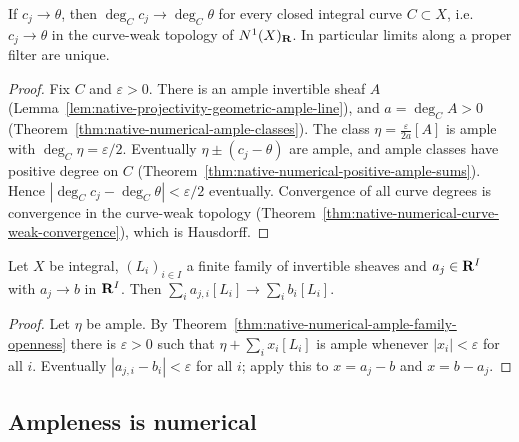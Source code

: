 \begin{lemma}
\label{lem:var-ample-convergence-curve-weak}
\leanok
{}
If $c_j\to\theta$, then $\deg_C c_j\to\deg_C\theta$ for every closed integral curve
$C\subset X$, i.e.\ $c_j\to\theta$ in the curve-weak topology of $N^1(X)_{\mathbf{R}}$. In particular
limits along a proper filter are unique.
\end{lemma}
\begin{proof}
Fix $C$ and $\varepsilon>0$. There is an ample invertible sheaf $A$
(Lemma~\ref{lem:native-projectivity-geometric-ample-line}), and $a=\deg_C A>0$
(Theorem~\ref{thm:native-numerical-ample-classes}). The class $\eta=\frac{\varepsilon}{2a}[A]$
is ample with $\deg_C\eta=\varepsilon/2$. Eventually $\eta\pm(c_j-\theta)$ are ample, and ample
classes have positive degree on $C$ (Theorem~\ref{thm:native-numerical-positive-ample-sums}).
Hence $|\deg_C c_j-\deg_C\theta|<\varepsilon/2$ eventually. Convergence of all curve degrees
is convergence in the curve-weak topology
(Theorem~\ref{thm:native-numerical-curve-weak-convergence}), which is Hausdorff.
\end{proof}

\begin{lemma}
\label{lem:var-ample-convergence-line-family}
\leanok
{}
Let $X$ be integral, $(L_i)_{i\in I}$ a finite family of invertible sheaves and $a_j\in\mathbf{R}^I$
with $a_j\to b$ in $\mathbf{R}^I$. Then $\sum_i a_{j,i}[L_i]\to\sum_i b_i[L_i]$.
\end{lemma}
\begin{proof}
Let $\eta$ be ample. By Theorem~\ref{thm:native-numerical-ample-family-openness} there is
$\varepsilon>0$ such that $\eta+\sum_ix_i[L_i]$ is ample whenever $|x_i|<\varepsilon$ for all
$i$. Eventually $|a_{j,i}-b_i|<\varepsilon$ for all $i$; apply this to $x=a_j-b$ and
$x=b-a_j$.
\end{proof}

\subsection{Ampleness is numerical}


